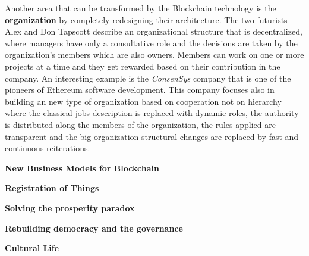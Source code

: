Another area that can be transformed by the Blockchain technology is the \textbf{organization} by completely redesigning their architecture. The two futurists Alex and Don Tapscott describe an organizational structure that is decentralized, where managers have only a consultative role and the decisions are taken by the organization's members which are also owners. Members can work on one or more projects at a time and they get rewarded based on their contribution in the company. An interesting example is the \emph{ConsenSys} company that is one of the pioneers of Ethereum software development. This company focuses also in building an new type of organization based on cooperation not on hierarchy where the classical jobs description is replaced with dynamic roles, the authority is distributed along the members of the organization, the rules applied are transparent and the big organization structural changes are replaced by fast and continuous reiterations.


\textbf{New Business Models for Blockchain}
	
\textbf{Registration of Things}

\textbf{Solving the prosperity paradox}


\textbf{Rebuilding democracy and the governance}

\textbf{Cultural Life}








 


